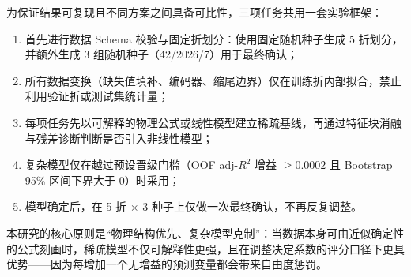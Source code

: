 为保证结果可复现且不同方案之间具备可比性，三项任务共用一套实验框架：

\begin{enumerate}[itemsep=0pt]
\item 首先进行数据 Schema 校验与固定折划分：使用固定随机种子生成 5 折划分，并额外生成 3 组随机种子（42/2026/7）用于最终确认；
\item 所有数据变换（缺失值填补、编码器、缩尾边界）仅在训练折内部拟合，禁止利用验证折或测试集统计量；
\item 每项任务先以可解释的物理公式或线性模型建立稀疏基线，再通过特征块消融与残差诊断判断是否引入非线性模型；
\item 复杂模型仅在越过预设晋级门槛（OOF adj-$R^2$ 增益 $\ge 0.0002$ 且 Bootstrap 95\% 区间下界大于 0）时采用；
\item 模型确定后，在 5 折 $\times$ 3 种子上仅做一次最终确认，不再反复调整。
\end{enumerate}

本研究的核心原则是``物理结构优先、复杂模型克制''：当数据本身可由近似确定性的公式刻画时，稀疏模型不仅可解释性更强，且在调整决定系数的评分口径下更具优势——因为每增加一个无增益的预测变量都会带来自由度惩罚。
